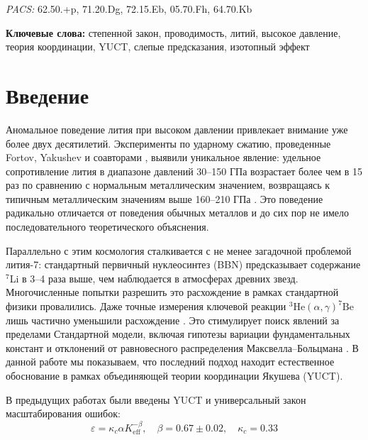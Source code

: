 \documentclass[12pt,a4paper]{article}
\theoremstyle{remark}
\newcommand{\Ke}{K_{\mathrm{eff}}}
\newcommand{\kappac}{\kappa_c}
\newcommand{\alp}{\alpha}
\newcommand{\pacs}{\textit{PACS:} 62.50.+p, 71.20.Dg, 72.15.Eb, 05.70.Fh, 64.70.Kb}
\begin{document}
\begin{titlepage}
\begin{center}
			\vspace{0.5cm}
			\noindent \pacs
			
			\vspace{0.5cm}
			\noindent \textbf{Ключевые слова:} степенной закон, проводимость, литий, высокое давление, теория координации, YUCT, слепые предсказания, изотопный эффект
		\end{center}
	\end{titlepage}
	
	\tableofcontents
	\newpage
	
	\section{Введение}
	
	Аномальное поведение лития при высоком давлении привлекает внимание уже более двух десятилетий. Эксперименты по ударному сжатию, проведенные Fortov, Yakushev и соавторами \cite{fortov2001, yakushev2002, fortov1999}, выявили уникальное явление: удельное сопротивление лития в диапазоне давлений 30–150 ГПа возрастает более чем в 15 раз по сравнению с нормальным металлическим значением, возвращаясь к типичным металлическим значениям выше 160–210 ГПа \cite{fortov2001, yakushev2002}. Это поведение радикально отличается от поведения обычных металлов и до сих пор не имело последовательного теоретического объяснения.
	
	Параллельно с этим космология сталкивается с не менее загадочной проблемой лития-7: стандартный первичный нуклеосинтез (BBN) предсказывает содержание \(^7\)Li в 3–4 раза выше, чем наблюдается в атмосферах древних звезд. Многочисленные попытки разрешить это расхождение в рамках стандартной физики провалились. Даже точные измерения ключевой реакции \(^3\mathrm{He}(\alpha,\gamma)^7\mathrm{Be}\) лишь частично уменьшили расхождение \cite{IAEA2017}. Это стимулирует поиск явлений за пределами Стандартной модели, включая гипотезы вариации фундаментальных констант \cite{HAL2006} и отклонений от равновесного распределения Максвелла–Больцмана \cite{bertulani2015}. В данной работе мы показываем, что последний подход находит естественное обоснование в рамках объединяющей теории координации Якушева (YUCT).
	
	В предыдущих работах \cite{yuct2026, appendixL, appendixC} были введены YUCT и универсальный закон масштабирования ошибок:
	\begin{equation}
		\varepsilon = \kappac \alp \Ke^{-\beta}, \quad \beta = 0.67 \pm 0.02, \quad \kappac = 0.33
		\label{eq:universal}
	\end{equation}
	
\end{document}
